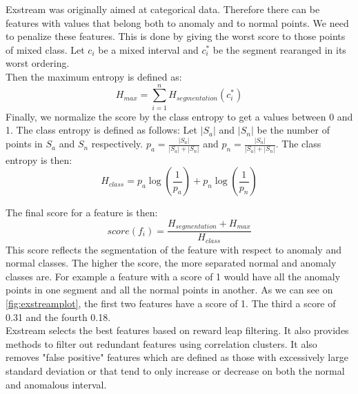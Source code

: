 \documentclass[oneside, a4paper, onecolumn, 11pt]{article}
\begin{document}
Exstream was originally aimed at categorical data. Therefore there can be features with values that belong both to anomaly and to normal points. We need to penalize these features. This is done by giving the worst score to those points of mixed class. Let $c_i$ be a mixed interval and $c_i^*$ be the segment rearanged in its worst ordering.\\
Then the maximum entropy is defined as:
\begin{equation}
    H_{max} = \sum_{i=1}^{n} H_{segmentation}(c_i^*)
\end{equation}
Finally, we normalize the score by the class entropy to get a values between 0 and 1. The class entropy is defined as follows:
Let $|S_a|$ and $|S_n|$ be the number of points in $S_a$ and $S_n$ respectively. $p_a = \frac{|S_a|}{|S_a| + |S_n|}$ and $p_n = \frac{|S_n|}{|S_a| + |S_n|}$. The class entropy is then:
\begin{equation}
    H_{class} = p_a \log(\frac{1}{p_a}) + p_n \log(\frac{1}{p_n})
\end{equation}

The final score for a feature is then:
\begin{equation}
    score(f_i) = \frac{H_{segmentation} + H_{max}}{H_{class}}
\end{equation}
This score reflects the segmentation of the feature with respect to anomaly and normal classes. The higher the score, the more separated normal and anomaly classes are. For example a feature with a score of 1 would have all the anomaly points in one segment and all the normal points in another. As we can see on \autoref{fig:exstreamplot}, the first two features have a score of 1. The third a score of 0.31 and the fourth 0.18.\\


Exstream selects the best features based on reward leap filtering. It also provides methods to filter out redundant features using correlation clusters. It also removes "false positive" features which are defined as those with excessively large standard deviation or that tend to only increase or decrease on both the normal and anomalous interval.\\
\end{document}
